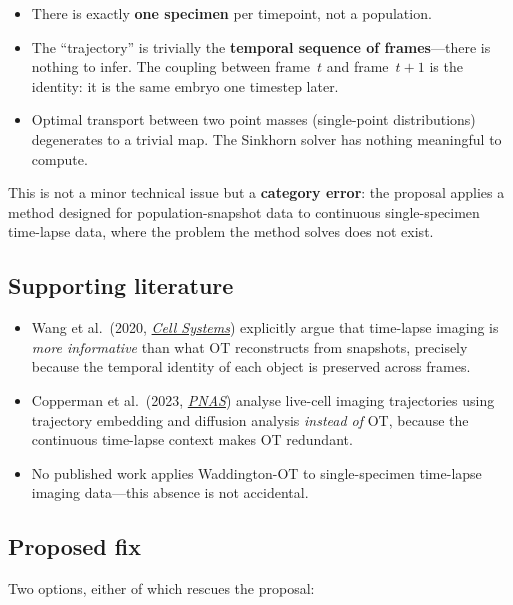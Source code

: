 \documentclass{article}
\begin{document}
\begin{itemize}
	\item There is exactly \textbf{one specimen} per timepoint, not a population.
	\item The ``trajectory'' is trivially the \textbf{temporal sequence of
		      frames}---there is nothing to infer. The coupling between frame~$t$ and
	      frame~$t{+}1$ is the identity: it is the same embryo one timestep later.
	\item Optimal transport between two point masses (single-point distributions)
	      degenerates to a trivial map. The Sinkhorn solver has nothing
	      meaningful to compute.
\end{itemize}

\noindent This is not a minor technical issue but a \textbf{category error}: the
proposal applies a method designed for population-snapshot data to
continuous single-specimen time-lapse data, where the problem the method solves
does not exist.

\subsection*{Supporting literature}

\begin{itemize}
	\item Wang et al.\ (2020,
	      \href{https://doi.org/10.1016/j.cels.2020.11.006}{\textit{Cell
			      Systems}}) explicitly argue that time-lapse imaging is \emph{more
		      informative} than what OT reconstructs from snapshots, precisely because
	      the temporal identity of each object is preserved across frames.
	\item Copperman et al.\ (2023,
	      \href{https://doi.org/10.1073/pnas.2216437120}{\textit{PNAS}}) analyse
	      live-cell imaging trajectories using trajectory embedding and diffusion
	      analysis \emph{instead of} OT, because the continuous time-lapse
	      context makes OT redundant.
	\item No published work applies Waddington-OT to single-specimen time-lapse
	      imaging data---this absence is not accidental.
\end{itemize}

\subsection*{Proposed fix}

Two options, either of which rescues the proposal:
\end{document}

